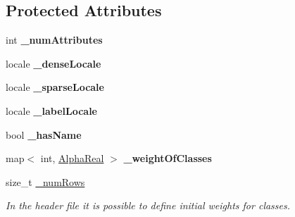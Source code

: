 \subsection*{Protected Attributes}
\begin{DoxyCompactItemize}
\item 
\hypertarget{classMultiBoost_1_1SVMLightParser_af09f2e4315c3c07d57cc0ee828861580}{int {\bfseries \-\_\-num\-Attributes}}\label{classMultiBoost_1_1SVMLightParser_af09f2e4315c3c07d57cc0ee828861580}

\item 
\hypertarget{classMultiBoost_1_1SVMLightParser_a142762cf0402e674341680c6ca9ea6fb}{locale {\bfseries \-\_\-dense\-Locale}}\label{classMultiBoost_1_1SVMLightParser_a142762cf0402e674341680c6ca9ea6fb}

\item 
\hypertarget{classMultiBoost_1_1SVMLightParser_a77d50362431b353165a2ebf1c08fed1a}{locale {\bfseries \-\_\-sparse\-Locale}}\label{classMultiBoost_1_1SVMLightParser_a77d50362431b353165a2ebf1c08fed1a}

\item 
\hypertarget{classMultiBoost_1_1SVMLightParser_a3ec4147d83509dc97c19b53ff7777f90}{locale {\bfseries \-\_\-label\-Locale}}\label{classMultiBoost_1_1SVMLightParser_a3ec4147d83509dc97c19b53ff7777f90}

\item 
\hypertarget{classMultiBoost_1_1SVMLightParser_a1d2df5c2d5f3494df3794ac412bc60d8}{bool {\bfseries \-\_\-has\-Name}}\label{classMultiBoost_1_1SVMLightParser_a1d2df5c2d5f3494df3794ac412bc60d8}

\item 
\hypertarget{classMultiBoost_1_1SVMLightParser_a84721136053db448b6332730bc339e78}{map$<$ int, \hyperlink{Defaults_8h_a80184c4fd10ab70a1a17c5f97dcd1563}{Alpha\-Real} $>$ {\bfseries \-\_\-weight\-Of\-Classes}}\label{classMultiBoost_1_1SVMLightParser_a84721136053db448b6332730bc339e78}

\item 
\hypertarget{classMultiBoost_1_1SVMLightParser_a479b963ebbf8975387ce95abf1190ce6}{size\-\_\-t \hyperlink{classMultiBoost_1_1SVMLightParser_a479b963ebbf8975387ce95abf1190ce6}{\-\_\-num\-Rows}}\label{classMultiBoost_1_1SVMLightParser_a479b963ebbf8975387ce95abf1190ce6}

\begin{DoxyCompactList}\small\item\em In the header file it is possible to define initial weights for classes. \end{DoxyCompactList}\end{DoxyCompactItemize}

